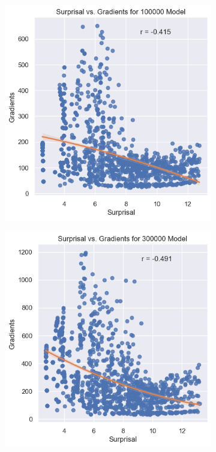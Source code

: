 \documentclass{IEEEtran}
\begin{document}
\begin{figure}[h]
\centering
\begin{subfigure}{0.4\textwidth}
    \centering
    \includegraphics[width=\textwidth]{surprisal_vs_gradients/100000.png}
\end{subfigure}
\begin{subfigure}{0.4\textwidth}
    \centering
    \includegraphics[width=\textwidth]{surprisal_vs_gradients/300000.png}
\end{subfigure}
\end{figure}
\end{document}
